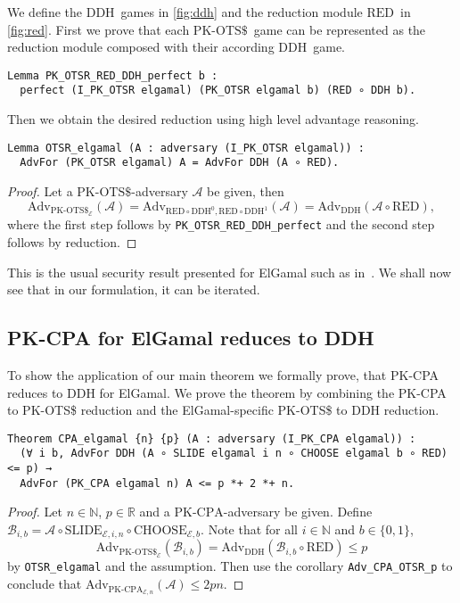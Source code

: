 \documentclass[a4paper,USenglish,cleveref, autoref]{lipics-v2021}
\newcommand{\M}[1]{\texttt{#1}}
\newcommand{\Adv}{\mathrm{Adv}}
\newcommand{\A}{\mathcal{A}}
\newcommand{\CPA}{\ensuremath{\mathrm{PK\text{-}CPA}}}
\newcommand{\OTSR}{\ensuremath{\mathrm{PK\text{-}OTS\$}}}
\newcommand{\DDH}{\ensuremath{\mathrm{DDH}}}
\newcommand{\RED}{\ensuremath{\mathrm{RED}}}
\newcommand{\SLIDE}{\ensuremath{\mathrm{SLIDE}}}
\newcommand{\CHOOSE}{\ensuremath{\mathrm{CHOOSE}}}
\begin{document}
We define the \DDH\ games in \cref{fig:ddh}
and the reduction module \RED\ in \cref{fig:red}.
First we prove that each \OTSR\ game can be represented as the reduction module composed with their according \DDH\ game.

\begin{verbatim}
Lemma PK_OTSR_RED_DDH_perfect b :
  perfect (I_PK_OTSR elgamal) (PK_OTSR elgamal b) (RED ∘ DDH b).
\end{verbatim}

Then we obtain the desired reduction using high level advantage reasoning.

\begin{verbatim}
Lemma OTSR_elgamal (A : adversary (I_PK_OTSR elgamal)) :
  AdvFor (PK_OTSR elgamal) A = AdvFor DDH (A ∘ RED).
\end{verbatim}
\begin{proof}
  Let a \OTSR-adversary $\A$ be given, then
  $$\Adv_{\OTSR_\mathcal{E}}(\A)
  = \Adv_{\RED \circ \DDH^0, \RED \circ \DDH^1}(\A)
  = \Adv_{\DDH}(\A \circ \RED),$$
  where the first step follows by \M{PK_OTSR_RED_DDH_perfect} and the second
  step follows by reduction.
\end{proof}

This is the usual security result presented for ElGamal such as in~\cite{gilles09,barthe11,petcher15fcf,haselwarter23popl}.
We shall now see that in our formulation, it can be iterated.
 
  \subsection{PK-CPA for ElGamal reduces to DDH}\label{sec:cpaddh}
 
  To show the application of our main theorem we formally prove, that PK-CPA reduces to DDH for ElGamal.
  We prove the theorem by combining the PK-CPA to PK-OTS\$ reduction and the ElGamal-specific PK-OTS\$ to DDH reduction.
  
  
\begin{verbatim}
Theorem CPA_elgamal {n} {p} (A : adversary (I_PK_CPA elgamal)) :
  (∀ i b, AdvFor DDH (A ∘ SLIDE elgamal i n ∘ CHOOSE elgamal b ∘ RED) <= p) →
  AdvFor (PK_CPA elgamal n) A <= p *+ 2 *+ n.
\end{verbatim}
\begin{proof}
  Let $n \in \mathbb{N}$, $p \in \mathbb{R}$ and a \CPA-adversary be given.
  Define $\mathcal{B}_{i,b} = \A \circ \SLIDE_{\mathcal{E},i,n} \circ \CHOOSE_{\mathcal{E},b}$.
  Note that for all $i \in \mathbb{N}$ and $b \in \{0, 1\}$,
  $$
  \Adv_{\OTSR_{\mathcal{E}}}(\mathcal{B}_{i,b}) =
  \Adv_{\DDH}(\mathcal{B}_{i,b} \circ \RED) \leq p
  $$
  by \M{OTSR_elgamal} and the assumption. Then use the corollary
  \M{Adv_CPA_OTSR_p} 
  to conclude that $\Adv_{\CPA_{\mathcal{E},n}}(\A) \leq 2pn$.
\end{proof}
\end{document}
